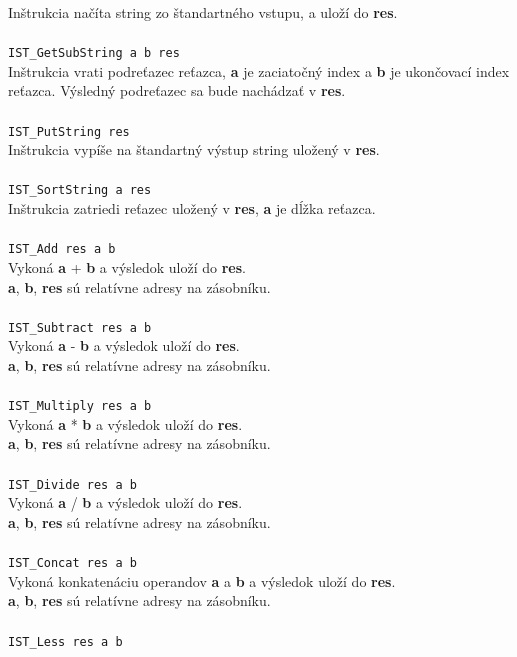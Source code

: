 \documentclass[12pt,a4paper,titlepage,final]{article}
\begin{document}
Inštrukcia načíta string zo štandartného vstupu, a uloží do \textbf{res}. \\
\\\texttt{IST\_GetSubString a b res}\\
Inštrukcia vrati podreťazec reťazca, \textbf{a} je zaciatočný index a \textbf{b} je
ukončovací index reťazca. Výsledný podreťazec sa bude nachádzať v \textbf{res}.\\
\\\texttt{IST\_PutString res}\\
Inštrukcia vypíše na štandartný výstup string uložený v \textbf{res}.\\
\\\texttt{IST\_SortString a res}\\
Inštrukcia zatriedi reťazec uložený v \textbf{res}, \textbf{a} je dĺžka reťazca.\\
\\\texttt{IST\_Add res a b}\\
Vykoná \textbf{a} + \textbf{b} a výsledok uloží do \textbf{res}.\\
\textbf{a}, \textbf{b}, \textbf{res} sú relatívne adresy na zásobníku.\\
\\\texttt{IST\_Subtract res a b}\\
Vykoná \textbf{a} - \textbf{b} a výsledok uloží do \textbf{res}.\\
\textbf{a}, \textbf{b}, \textbf{res} sú relatívne adresy na zásobníku.\\
\\\texttt{IST\_Multiply res a b}\\
Vykoná \textbf{a} * \textbf{b} a výsledok uloží do \textbf{res}.\\
\textbf{a}, \textbf{b}, \textbf{res} sú relatívne adresy na zásobníku.\\
\\\texttt{IST\_Divide res a b}\\
Vykoná \textbf{a} / \textbf{b} a výsledok uloží do \textbf{res}.\\
\textbf{a}, \textbf{b}, \textbf{res} sú relatívne adresy na zásobníku.\\
\\\texttt{IST\_Concat res a b}\\
Vykoná konkatenáciu operandov \textbf{a} a \textbf{b} a výsledok uloží do \textbf{res}.\\
\textbf{a}, \textbf{b}, \textbf{res} sú relatívne adresy na zásobníku.\\
\\\texttt{IST\_Less res a b}\\
\end{document}
